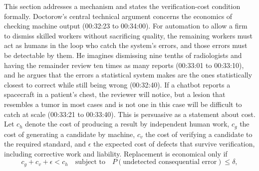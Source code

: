 \documentclass[12pt]{article}
\newcommand{\ts}[1]{(#1)}
\begin{document}
This section addresses a mechanism and states the verification-cost condition formally. Doctorow's central technical argument concerns the economics of checking machine output \ts{00:32:23 to 00:34:00}. For automation to allow a firm to dismiss skilled workers without sacrificing quality, the remaining workers must act as humans in the loop who catch the system's errors, and those errors must be detectable by them. He imagines dismissing nine tenths of radiologists and having the remainder review ten times as many reports \ts{00:33:01 to 00:33:10}, and he argues that the errors a statistical system makes are the ones statistically closest to correct while still being wrong \ts{00:32:40}. If a chatbot reports a spacecraft in a patient's chest, the reviewer will notice, but a lesion that resembles a tumor in most cases and is not one in this case will be difficult to catch at scale \ts{00:33:21 to 00:33:40}. This is persuasive as a statement about cost. Let $c_h$ denote the cost of producing a result by independent human work, $c_g$ the cost of generating a candidate by machine, $c_v$ the cost of verifying a candidate to the required standard, and $\epsilon$ the expected cost of defects that survive verification, including corrective work and liability. Replacement is economical only if
\begin{equation}
c_g + c_v + \epsilon < c_h \quad \text{subject to} \quad P(\text{undetected consequential error}) \leq \delta ,
\end{equation}
\end{document}
